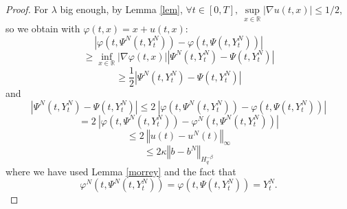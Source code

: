 \documentclass[11pt]{enstaPRE}
\newcommand{\norme}[1]{\left\Vert #1\right\Vert}
\newcommand{\R}{\mathbb{R}}
\begin{document}
\begin{proof}
    For $\lambda$ big enough, by Lemma \ref{lem}, $\forall t \in[0,T],\ \underset{x\in\R}{\sup}\left|\nabla u(t,x)\right| \leq 1/2$, so we obtain with $\varphi(t,x)=x+u(t,x)$:
    \begin{equation*}
    \left|\varphi\left(t,\Psi^N\left(t,Y_t^N\right)\right)-\varphi\left(t,\Psi\left(t,Y_t^N\right)\right)\right| 
    \end{equation*}
    \begin{equation*}
    \geq \underset{x\in\R}{\inf}\left|\nabla\varphi(t,x)\right|
    \left|\Psi^N\left(t,Y_t^N\right)-\Psi\left(t,Y_t^N\right)\right|
    \end{equation*}
    \begin{equation*}
    \geq \frac{1}{2} \left|\Psi^N\left(t,Y_t^N\right)-\Psi\left(t,Y_t^N\right)\right|
    \end{equation*}    
    and 
    \begin{equation*}
    \left|\Psi^N\left(t,Y_t^N\right)-\Psi\left(t,Y_t^N\right)\right|\leq 2\ \left|\varphi\left(t,\Psi^N\left(t,Y_t^N\right)\right)-\varphi\left(t,\Psi\left(t,Y_t^N\right)\right)\right|
    \end{equation*}   
    \begin{equation*}
    = 2\ \left|\varphi\left(t,\Psi^N\left(t,Y_t^N\right)\right)-\varphi^N\left(t,\Psi^N\left(t,Y_t^N\right)\right)\right|
    \end{equation*}   
    \begin{equation*}
    \leq 2\ \norme{u(t)-u^N(t)}_\infty
    \end{equation*} 
    \begin{equation*}\label{other}
    \leq 2\kappa \norme{b-b^N}_{H^{-\beta}_q}
    \end{equation*} 
    where we have used Lemma \ref{morrey} and the fact that \begin{equation*}
    \varphi^N\left(t,\Psi^N\left(t,Y_t^N\right)\right)=\varphi\left(t,\Psi\left(t,Y_t^N\right)\right) = Y_t^N.
    \end{equation*}
\end{proof}
\end{document}
